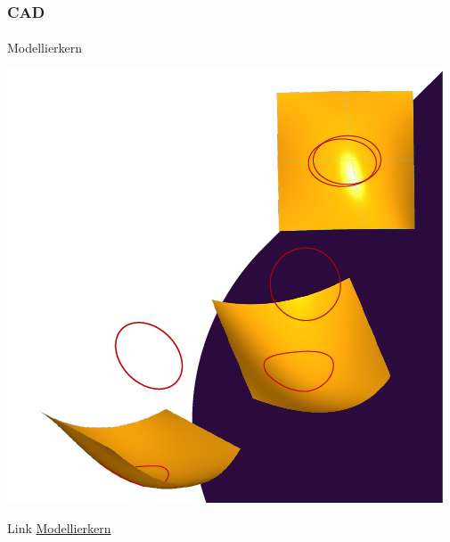 \documentclass{beamer}
\begin{document}
\begin{frame}
    \frametitle{CAD}
\framesubtitle{}
    \begin{block}{Modellierkern}
\begin{center}
\includegraphics[scale=0.25]{images/kern}
\end{center}
\end{block}

\begin{block}{Link}
\href{https://de.wikipedia.org/wiki/Modellierkern}{Modellierkern}
\end{block}

\end{frame}
\end{document}
